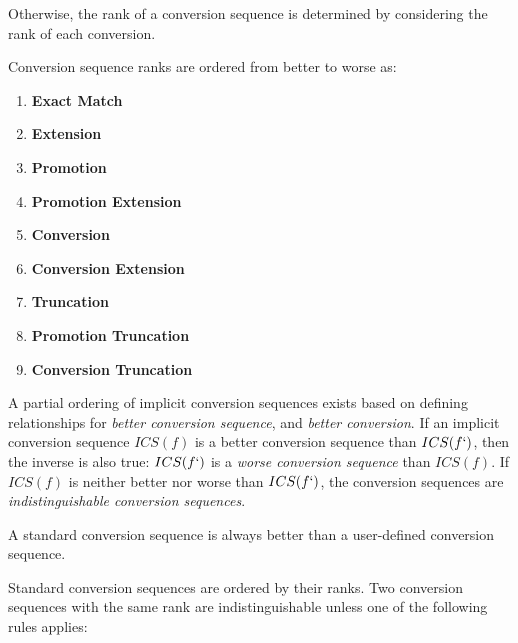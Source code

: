 \p Otherwise, the rank of a conversion sequence is determined by considering the
rank of each conversion.

\p Conversion sequence ranks are ordered from better to worse as:
\begin{enumerate}
  \item \textbf{Exact Match}
  \item \textbf{Extension}
  \item \textbf{Promotion}
  \item \textbf{Promotion Extension}
  \item \textbf{Conversion}
  \item \textbf{Conversion Extension}
  \item \textbf{Truncation}
  \item \textbf{Promotion Truncation}
  \item \textbf{Conversion Truncation}
\end{enumerate}



\p A partial ordering of implicit conversion sequences exists based on defining
relationships for \textit{better conversion sequence}, and \textit{better
conversion}. If an implicit conversion sequence \(ICS(f)\) is a better
conversion sequence than \(ICS(f`)\), then the inverse is also true: \(ICS(f`)\)
is a \textit{worse conversion sequence} than \(ICS(f)\). If \(ICS(f)\) is
neither better nor worse than \(ICS(f`)\), the conversion sequences are
\textit{indistinguishable conversion sequences}.

\p A standard conversion sequence is always better than a user-defined
conversion sequence.

\p Standard conversion sequences are ordered by their ranks. Two conversion
sequences with the same rank are indistinguishable unless one of the following
rules applies:

